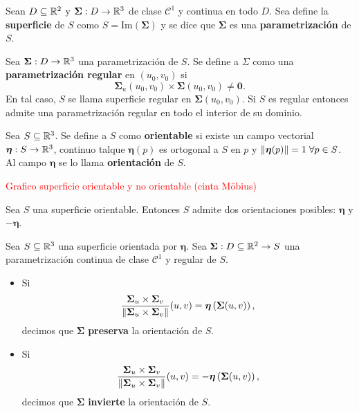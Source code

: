 \begin{definition}
    Sean $D\subseteq\mathbb{R}^2$ y $\boldsymbol{\Sigma}:D\to\mathbb{R}^3$ de clase $\mathcal{C}^1$ y continua en todo $D$. Sea define la \textbf{superficie} de $S$ como $S=\text{Im}(\boldsymbol{\Sigma})$ y se dice que $\boldsymbol{\Sigma}$ es una \textbf{parametrizaci\'on} de $S$.
\end{definition}

\begin{definition}
    Sea $\boldsymbol{\Sigma}:D\to\mathbb{R}^3$ una parametrizaci\'on de $S$. Se define a $\Sigma$ como una \textbf{parametrizaci\'on regular} en $(u_0, v_0)$ si
    \[
        \boldsymbol{\Sigma}_u(u_0,v_0)\times\boldsymbol{\Sigma}(u_0,v_0)\neq \boldsymbol{0}.
    \]
    En tal caso, $S$ se llama superficie regular en $\boldsymbol{\Sigma}(u_0,v_0)$. Si $S$ es regular entonces admite una parametrizaci\'on regular en todo el interior de su dominio.
\end{definition}

\begin{definition}
    Sea $S\subseteq\mathbb{R}^3$. Se define a $S$ como \textbf{orientable} si existe un campo vectorial $\boldsymbol{\eta}:S\to\mathbb{R}^3$, continuo talque $\boldsymbol{\eta}(p)$ es ortogonal a $S$ en $p$ y $\norm{\boldsymbol{\eta}(p)}=1\;\forall p\in S$. Al campo $\boldsymbol{\eta}$ se lo llama \textbf{orientaci\'on} de $S$.
\end{definition}

\textcolor{red}{Grafico superficie orientable y no orientable (cinta Möbius)}

\begin{obs}
    Sea $S$ una superficie orientable. Entonces $S$ admite dos orientaciones posibles: $\boldsymbol{\eta}$ y $-\boldsymbol{\eta}$.
\end{obs}

\begin{definition}
    Sea $S\subseteq\mathbb{R}^3$ una superficie orientada por $\boldsymbol{\eta}$. Sea $\boldsymbol{\Sigma}:D\subseteq\mathbb{R}^2\to S$ una parametrizaci\'on continua de clase $\mathcal{C}^1$ y regular de $S$.
    \begin{itemize}
        \item Si \[
            \frac{\boldsymbol{\Sigma}_u\times\boldsymbol{\Sigma}_v}{\norm{\boldsymbol{\Sigma}_u\times\boldsymbol{\Sigma}_v}}(u,v)=\boldsymbol{\eta}\left(\boldsymbol{\Sigma}(u,v)\right),
        \]  
        decimos que $\boldsymbol{\Sigma}$ \textbf{preserva} la orientaci\'on de $S$.
        \item Si \[
            \frac{\boldsymbol{\Sigma}_u\times\boldsymbol{\Sigma}_v}{\norm{\boldsymbol{\Sigma}_u\times\boldsymbol{\Sigma}_v}}(u,v)=-\boldsymbol{\eta}\left(\boldsymbol{\Sigma}(u,v)\right),
        \]
        decimos que $\boldsymbol{\Sigma}$ \textbf{invierte} la orientaci\'on de $S$.  
    \end{itemize}
\end{definition}

